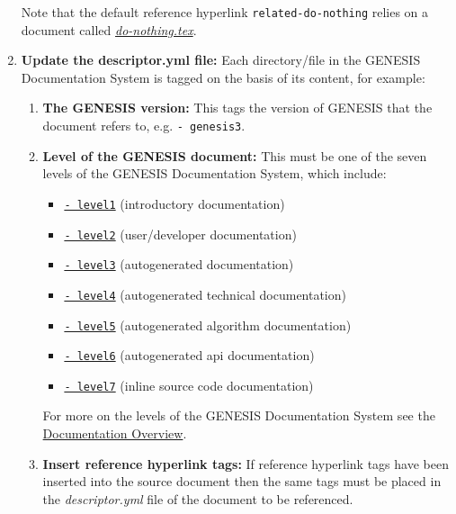 \documentclass[12pt]{article}
\begin{document}
\begin{enumerate}
Note that the default reference hyperlink {\tt related-do-nothing} relies on a document called \href{../do-nothing/do-nothing.tex}{\it do-nothing.tex}. 

\item {\bf Update the descriptor.yml file:} Each directory/file in the GENESIS Documentation System is tagged on the basis of its content, for example:

   \begin{enumerate}

      \item  {\bf The GENESIS version:} This tags the version of GENESIS that the document refers to, e.g. {\tt -\,genesis3}.

      \item {\bf Level of the GENESIS document:} This must be one of the seven levels of the GENESIS Documentation System, which include:
      
      \begin{itemize}
         \item[]\href{../contents-level1/contents-level1.tex}{\tt -\,level1} (introductory documentation)
         \item[]\href{../contents-level2/contents-level2.tex}{\tt -\,level2} (user/developer documentation)
         \item[]\href{../contents-level3/contents-level3.tex}{\tt -\,level3} (autogenerated documentation)
         \item[]\href{../contents-level4/contents-level4.tex}{\tt -\,level4} (autogenerated technical documentation)
         \item[]\href{../contents-level5/contents-level5.tex}{\tt -\,level5} (autogenerated algorithm documentation)
         \item[]\href{../contents-level6/contents-level6.tex}{\tt -\,level6} (autogenerated api documentation)
         \item[]\href{../contents-level7/contents-level7.tex}{\tt -\,level7} (inline source code documentation)
      \end{itemize}

For more on the levels of the GENESIS Documentation System see the \href{../documentation-overview/documentation-overview.tex}{Documentation Overview}.

\item {\bf Insert reference hyperlink tags:} If reference hyperlink tags have been inserted into the source document then the same tags must be placed in the {\it descriptor.yml} file of the document to be referenced.


\end{enumerate}
\end{enumerate}
\end{document}

